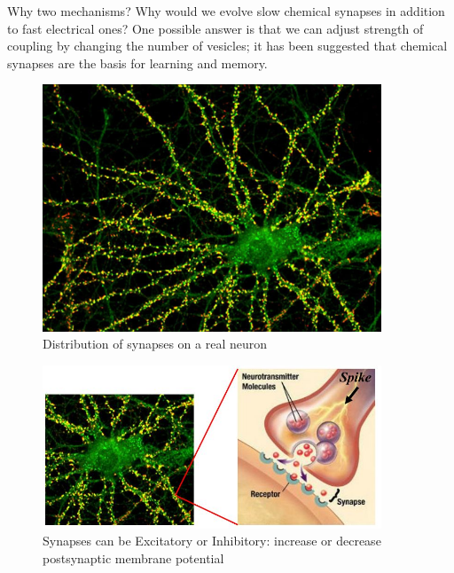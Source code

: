 \documentclass[]{article}
\begin{document}
Why two mechanisms? Why would we evolve slow chemical synapses in addition to fast electrical ones? One possible answer is that we can adjust strength of coupling by changing the number of vesicles; it has been suggested that chemical synapses are the basis for learning and memory.
\begin{figure}[H]
	\caption[Distribution of synapses on a real neuron]{Distribution of synapses on a real neuron}
	\includegraphics[width=0.9\textwidth]{synapse2}
\end{figure}

\begin{figure}[H]
	\caption[Synapses can be Excitatory or Inhibitory]{Synapses can be Excitatory or Inhibitory: increase or decrease postsynaptic membrane potential}
	\includegraphics[width=0.9\textwidth]{synapse3}
\end{figure}
\end{document}
